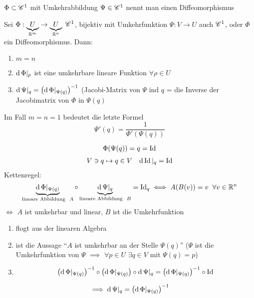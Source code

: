 \begin{Def}
  $\Phi\subset\mathscr{C}^1$ mit Umkehrabbildung $\Psi\in\mathscr{C}^1$ nennt man einen Diffeomorphismus
\end{Def}
\begin{Lem}
  Sei $\Phi:\underbrace{U}_{\mathbb{R}^{m}}\rightarrow\underbrace{U}_{\mathbb{R}^{n}}$ $\mathscr{C}^1$, bijektiv mit Umkehrfunktion $\Psi:V\to U$ auch $\mathscr{C}^1$, oder $\Phi$ ein Diffeomorphismus. Dann:
  \begin{enumerate}
    \item $m=n$
    \item $\operatorname{d}\Phi|_p$ ist eine umkehrbare lineare Funktion $\forall \rho\in U$
    \item $\operatorname{d}\Psi|_q=\left( \operatorname{d}\Phi|_{\Psi(q)} \right)^{-1}$ (Jacobi-Matrix von $\Psi$ ind $q$ = die Inverse der Jacobimatrix von $\Phi$ in $\Psi(q)$
  \end{enumerate}
  Im Fall $m=n=1$ bedeutet die letzte Formel
  \[\Psi'(q)=\frac{1}{\Phi'(\Psi(q))}\]
\end{Lem}
\begin{Bew}
  \[\Phi(\Psi(q))=q=\operatorname{Id}\]
  \begin{align*}
    V\ni q\mapsto q\in V &&\operatorname{d}\operatorname{Id}|_{q}=\operatorname{Id}
  \end{align*}
  Kettenregel:
  \[\underbrace{\operatorname{d}\Phi|_{\Psi(q)}}_{\text{lineare Abbildung}\hspace{2mm} A}\circ\underbrace{\operatorname{d}\Psi|_{q}}_{\text{lineare Abbildung}\hspace{2mm} B}=\operatorname{Id}_q\iff A(B(v))=v\hspace{2mm}\forall v\in\mathbb{R}^n\]
  $\iff$ $A$ ist umkehrbar und linear, $B$ ist die Umkehrfunktion
  \begin{enumerate}
    \item flogt aus der linearen Algebra
    \item ist die Aussage ``$A$ ist umkehrbar an der Stelle $\Psi(q)$'' ($\Psi$ ist die Umkehrfunktion von $\Psi$ $\implies$ $\forall p\in U$ $\exists q\in V$ mit $\Psi(q)=p$)
    \item \[\left( \operatorname{d}\Phi|_{\Psi(q)} \right)^{-1}\circ \left( \operatorname{d}\Phi|_{\Psi(q)} \right)\circ \operatorname{d}\Psi|_q=\left( \operatorname{d} \Phi|_{\Psi(q)} \right)^{-1}\circ\operatorname{Id}\]
  \end{enumerate}
  \[\implies \operatorname{d} \Psi|_q=\left( \operatorname{d}\Phi|_{\Psi(q)} \right)^{-1}\]
\end{Bew}
